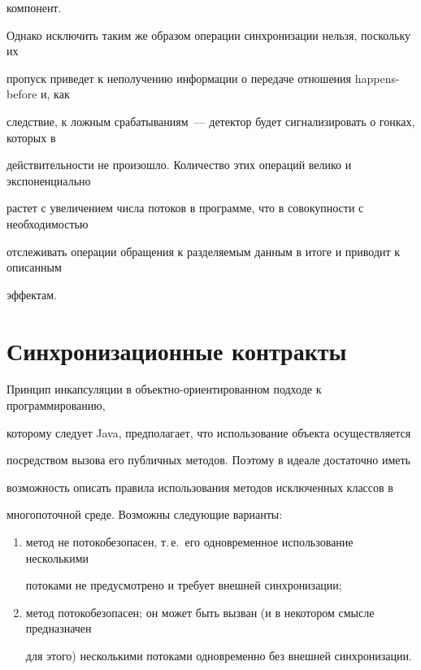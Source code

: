 компонент.



  Однако исключить таким же образом операции синхронизации нельзя, поскольку их

пропуск приведет к неполучению информации о передаче отношения happens-before и, как

следствие, к ложным срабатываниям~--- детектор будет сигнализировать о гонках, которых в

действительности не произошло. Количество этих операций велико и экспоненциально

растет с увеличением числа потоков в программе, что в совокупности с необходимостью

отслеживать операции обращения к разделяемым данным в итоге и приводит к описанным

эффектам.



\vspace*{-4pt}



\section{Синхронизационные контракты}



\vspace*{-2pt}



  Принцип инкапсуляции в объектно-ориентированном подходе к программированию,

которому следует Java, предполагает, что использование объекта осуществляется

посредством вызова его публичных методов. Поэтому в идеале достаточно иметь

возможность описать правила использования методов исключенных классов в

многопоточной среде. Возможны следующие варианты:

  \begin{enumerate}[(1)]

\item метод не потокобезопасен, т.\,е.\ его одновременное использование несколькими

потоками не предусмотрено и требует внешней синхронизации;

\item метод потокобезопасен; он может быть вызван (и в некотором смысле предназначен

для этого) несколькими потоками одновременно без внешней синхронизации.

\end{enumerate}



